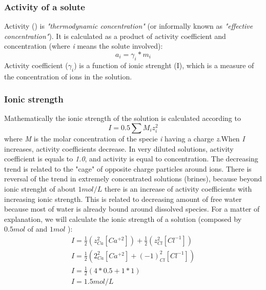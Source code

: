 \documentclass[ppgc,mestrado,English]{iiufrgs}
\begin{document}


\subsubsection{Activity of a solute}
Activity () is \emph{"thermodynamic concentration"} (or informally known as \emph{"effective concentration"}). It is calculated as a product of activity coefficient and concentration (where \emph{i} means the solute involved):
\begin{equation}\label{activityEq}
a_i = \gamma_i * m_i
\end{equation}
Activity coefficient ($\gamma_i$) is a function of ionic strenght (I), which is a measure of the concentration of ions in the solution.  

\subsubsection{Ionic strength}
Mathematically the ionic strength of the solution is calculated according to
\begin{equation} \label{eq:ionicStrength}
I = 0.5 \sum{M_i z_i^2}
\end{equation}
where \emph{M} is the molar concentration of the specie \emph{i} having a charge \emph{z}.When \emph{I} increases, activity coefficients decrease. In very diluted solutions, activity coefficient is equals to \emph{1.0}, and activity is equal to concentration. The decreasing trend is related to the "cage" of opposite charge particles around ions. There is reversal of the trend in extremely concentrated solutions (brines), because beyond ionic strenght of about $1 mol/L$ there is an increase of activity coefficients with increasing ionic strength. This is related to decreasing amount of free water because most of water is already bound around dissolved species.
For a matter of explanation, we will calculate the ionic strength of a  solution (composed by $0.5 mol$ of  and $1 mol$ ):
\begin{eqnarray}
I = \frac{1}{2}  (z^2_{Ca}[Ca^{+2}]) + \frac{1}{2}  (z^2_{Cl}[Cl^{-1}]) \\
I = \frac{1}{2}  (2^2_{Ca}[Ca^{+2}] +  (-1)^2_{Cl}[Cl^{-1}]) \\
I = \frac{1}{2} (4 * 0.5 + 1 * 1) \\
I = 1.5 mol/L
\end{eqnarray}
\end{document}
